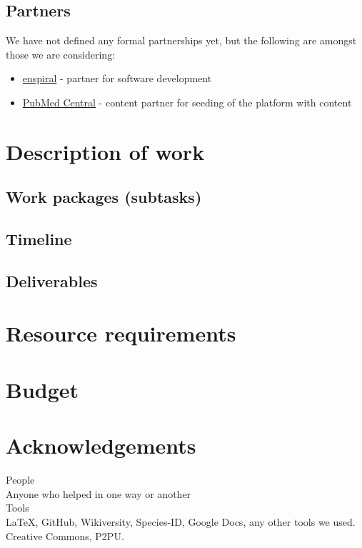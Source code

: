 \documentclass[final,authoryear,3p]{elsarticle-open-drafting}
\begin{document}
\begin{enumerate}
\subsection{Partners}
We have not defined any formal partnerships yet, but the following are amongst those we are considering:
\begin{itemize}
	\item \href{http://www.enspiral.com}{enspiral} - partner for software development
	\item \href{http://www.ncbi.nlm.nih.gov/pmc/}{PubMed Central} - content partner for seeding of the platform with content
	
\end{itemize}

\section{Description of work}
\subsection{Work packages (subtasks)}
\subsection{Timeline}
\subsection{Deliverables}

\section{Resource requirements}
\section{Budget}
\section{Acknowledgements}
People\\
Anyone who helped in one way or another\\

Tools\\
\LaTeX, GitHub, Wikiversity, Species-ID, Google Docs, any other tools we used.
Creative Commons, P2PU.


\end{enumerate}
\end{document}
